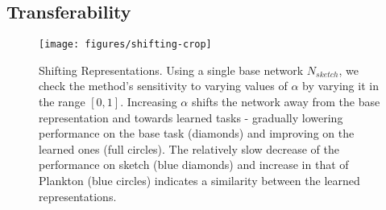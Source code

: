 \documentclass[10pt,journal,compsoc]{IEEEtran}
\begin{document}
\subsection{Transferability\label{subsec:Transferability}}
\begin{center}
\begin{figure}
\begin{centering}
\texttt{[image: figures/shifting-crop]}
\par\end{centering}
\caption{\label{fig:Shifting-Representations.-Using}Shifting Representations.
Using a single base network $N_{sketch}$, we check the method's sensitivity
to varying values of $\alpha$ by varying it in the range $[0,1]$.
Increasing $\alpha$ shifts the network away from the base representation
and towards learned tasks - gradually lowering performance on the
base task (diamonds) and improving on the learned ones (full circles).
The relatively slow decrease of the performance on sketch (blue diamonds)
and increase in that of Plankton (blue circles) indicates a similarity
between the learned representations.}
\end{figure}
\par\end{center}

\begin{center}
\begin{figure*}
\begin{centering}
\par\end{centering}
\caption{\label{fig:(a)-Accuracy-vs.}(a) Accuracy vs. learning method. Using
only the last layer (\emph{feature extractor}) performs worst. \emph{finetune}:
vanilla fine-tuning. \emph{Diagonal} : our controller modules with
a diagonal combination matrix. \emph{Linear}: our full method. On
average, our full method outperforms vanilla fine tuning. (b) Accuracy
vs. quantization: with as low as 8 bits, we see no significant effect
of network quantization on our method, showing they can be applied
together. }
\end{figure*}
\par\end{center}
\end{document}
